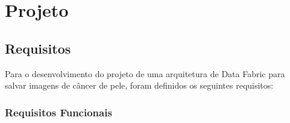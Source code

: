
\chapter[Projeto]{Projeto}

\section{Requisitos}

Para o desenvolvimento do projeto de uma arquitetura de Data Fabric para salvar imagens de câncer de pele, foram definidos os seguintes requisitos:

\subsection{Requisitos Funcionais}


